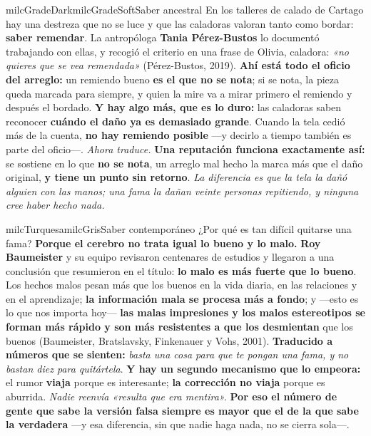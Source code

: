 \documentclass[11pt,letterpaper]{article}
\begin{document}
\begin{softbox}{milcGradeDark}{milcGradeSoft}{Saber ancestral}
En los talleres de calado de Cartago hay una destreza que no se luce y que las caladoras valoran tanto como bordar: \textbf{saber remendar}. La antropóloga \textbf{Tania Pérez-Bustos} lo documentó trabajando con ellas, y recogió el criterio en una frase de Olivia, caladora: \emph{«no quieres que se vea remendada»} (Pérez-Bustos, 2019). \textbf{Ahí está todo el oficio del arreglo:} un remiendo bueno \textbf{es el que no se nota}; si se nota, la pieza queda marcada para siempre, y quien la mire va a mirar primero el remiendo y después el bordado. \textbf{Y hay algo más, que es lo duro:} las caladoras saben reconocer \textbf{cuándo el daño ya es demasiado grande}. Cuando la tela cedió más de la cuenta, \textbf{no hay remiendo posible} ---y decirlo a tiempo también es parte del oficio---. \emph{Ahora traduce.} \textbf{Una reputación funciona exactamente así:} se sostiene en lo que \textbf{no se nota}, un arreglo mal hecho la marca más que el daño original, \textbf{y tiene un punto sin retorno}. \emph{La diferencia es que la tela la dañó alguien con las manos; una fama la dañan veinte personas repitiendo, y ninguna cree haber hecho nada.}
\end{softbox}

\begin{softbox}{milcTurquesa}{milcGris}{Saber contemporáneo}
¿Por qué es tan difícil quitarse una fama? \textbf{Porque el cerebro no trata igual lo bueno y lo malo.} \textbf{Roy Baumeister} y su equipo revisaron centenares de estudios y llegaron a una conclusión que resumieron en el título: \textbf{lo malo es más fuerte que lo bueno}. Los hechos malos pesan más que los buenos en la vida diaria, en las relaciones y en el aprendizaje; \textbf{la información mala se procesa más a fondo}; y ---esto es lo que nos importa hoy--- \textbf{las malas impresiones y los malos estereotipos se forman más rápido y son más resistentes a que los desmientan} que los buenos (Baumeister, Bratslavsky, Finkenauer y Vohs, 2001). \textbf{Traducido a números que se sienten:} \emph{basta una cosa para que te pongan una fama, y no bastan diez para quitártela}. \textbf{Y hay un segundo mecanismo que lo empeora:} el rumor \textbf{viaja} porque es interesante; \textbf{la corrección no viaja} porque es aburrida. \emph{Nadie reenvía «resulta que era mentira».} \textbf{Por eso el número de gente que sabe la versión falsa siempre es mayor que el de la que sabe la verdadera} ---y esa diferencia, sin que nadie haga nada, no se cierra sola---.
\end{softbox}
\end{document}
